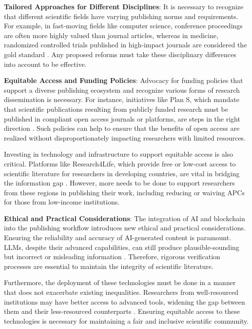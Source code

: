\documentclass{article}
\begin{document}
\textbf{Tailored Approaches for Different Disciplines}: 
It is necessary to recognize that different scientific fields have varying publishing norms and requirements. For example, in fast-moving fields like computer science, conference proceedings are often more highly valued than journal articles, whereas in medicine, randomized controlled trials published in high-impact journals are considered the gold standard \cite{hyland2016academic}. Any proposed reforms must take these disciplinary differences into account to be effective.

\textbf{Equitable Access and Funding Policies}: 
Advocacy for funding policies that support a diverse publishing ecosystem and recognize various forms of research dissemination is necessary. For instance, initiatives like Plan S, which mandate that scientific publications resulting from publicly funded research must be published in compliant open access journals or platforms, are steps in the right direction \cite{coalition2018plan}. Such policies can help to ensure that the benefits of open access are realized without disproportionately impacting researchers with limited resources.

Investing in technology and infrastructure to support equitable access is also critical. Platforms like Research4Life, which provide free or low-cost access to scientific literature for researchers in developing countries, are vital in bridging the information gap \cite{research4life}. However, more needs to be done to support researchers from these regions in publishing their work, including reducing or waiving APCs for those from low-income institutions.

\textbf{Ethical and Practical Considerations}: 
The integration of AI and blockchain into the publishing workflow introduces new ethical and practical considerations. Ensuring the reliability and accuracy of AI-generated content is paramount. LLMs, despite their advanced capabilities, can still produce plausible-sounding but incorrect or misleading information \cite{bender2021dangers}. Therefore, rigorous verification processes are essential to maintain the integrity of scientific literature.

Furthermore, the deployment of these technologies must be done in a manner that does not exacerbate existing inequalities. Researchers from well-resourced institutions may have better access to advanced tools,  widening the gap between them and their less-resourced counterparts \cite{leins2020gpt3}. Ensuring equitable access to these technologies is necessary for maintaining a fair and inclusive scientific community.
\end{document}
